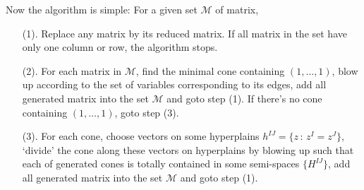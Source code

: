 \documentclass[12pt]{article}
\theoremstyle{definition}
\theoremstyle{plain}
\begin{document}
Now the algorithm is simple: For a given set $\mathcal M$ of matrix,
\begin{enumerate}
	\item[(1).] Replace any matrix by its reduced matrix. If all matrix in the set
		have only one column or row, the algorithm stops.
	\item[(2).] For each matrix in $\mathcal M$, find the minimal cone containing $(1,\dots,1)$, 
		blow up according to
		the set of variables corresponding to its edges, add all generated matrix into 
		the set $\mathcal M$ and goto step (1).
		If there's no cone containing $(1,\dots,1)$, goto step (3).
	\item[(3).] For each cone, choose vectors on some hyperplains $h^{IJ}=\{z\,:\, z^I=z^J\}$,
		`divide' the cone along these vectors on hyperplains by blowing up such that 
		each of generated cones is totally contained in some semi-spaces $\{H^{IJ}\}$, 
		add all generated matrix into the set $\mathcal M$ and goto step (1).
\end{enumerate}
\end{document}

